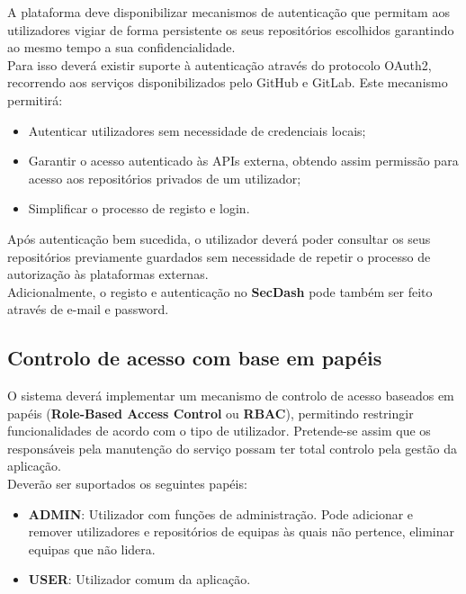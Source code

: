 A plataforma deve disponibilizar mecanismos de autenticação que permitam aos utilizadores vigiar de forma persistente os seus repositórios escolhidos garantindo ao mesmo tempo a sua confidencialidade.\\

Para isso deverá existir suporte à autenticação através do protocolo OAuth2, recorrendo aos serviços disponibilizados pelo GitHub e GitLab. Este mecanismo permitirá:
\begin{itemize}
	\item Autenticar utilizadores sem necessidade de credenciais locais;
	\item Garantir o acesso autenticado às APIs externa, obtendo assim permissão para acesso aos repositórios privados de um utilizador;
	\item Simplificar o processo de registo e login.
\end{itemize}

Após autenticação bem sucedida, o utilizador deverá poder consultar os seus repositórios previamente guardados sem necessidade de repetir o processo de autorização às plataformas externas. \\

Adicionalmente, o registo e autenticação no \textbf{SecDash} pode também ser feito através de e-mail e password. \\

\subsection{Controlo de acesso com base em papéis}

O sistema deverá implementar um mecanismo de controlo de acesso baseados em papéis (\textbf{Role-Based Access Control} ou \textbf{RBAC}), permitindo restringir funcionalidades de acordo com o tipo de utilizador. Pretende-se assim que os responsáveis pela manutenção do serviço possam ter total controlo pela gestão da aplicação. \\

Deverão ser suportados os seguintes papéis:
\begin{itemize}
	\item \textbf{ADMIN}: Utilizador com funções de administração. Pode adicionar e remover utilizadores e repositórios de equipas às quais não pertence, eliminar equipas que não lidera.
	
	\item \textbf{USER}: Utilizador comum da aplicação.
\end{itemize}

